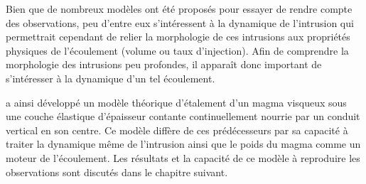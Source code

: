 Bien que de  nombreux modèles ont été proposés pour  essayer de rendre
compte des observations, peu d'entre  eux s'intéressent à la dynamique
de l'intrusion qui  permettrait cependant de relier  la morphologie de
ces  intrusions aux  propriétés physiques  de l'écoulement  (volume ou
taux d'injection).   Afin de comprendre la  morphologie des intrusions
peu  profondes,  il  apparaît  donc important  de  s'intéresser  à  la
dynamique d'un tel écoulement.

\citet{Michaut:2011kg}   a  ainsi   développé   un  modèle   théorique
d'étalement d'un magma visqueux  sous une couche élastique d'épaisseur
contante  continuellement  nourrie  par  un conduit  vertical  en  son
centre.   Ce modèle  diffère de  ces prédécesseurs  par sa  capacité à
traiter la dynamique  même de l'intrusion ainsi que le  poids du magma
comme un  moteur de l'écoulement. Les  résultats et la capacité  de ce
modèle à  reproduire les observations  sont discutés dans  le chapitre
suivant.

\newpage



